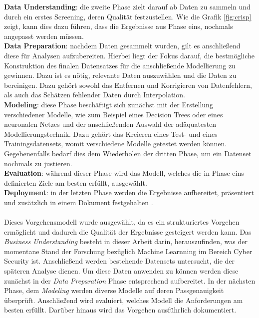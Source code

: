 \documentclass[
    12pt, %
    DIV10,
    ngerman, %
    a4paper, %
    oneside, %
    titlepage, %
    parskip=half, %
    headings=normal, %
    listof=totoc, %
    bibliography=totoc, %
    index=totoc, %
    captions=tableheading, %
    final %
]{scrreprt}
\begin{document}
\textbf{Data Understanding}: die zweite Phase zielt darauf ab Daten zu sammeln und durch ein erstes Screening, deren Qualität festzustellen. Wie die Grafik \ref{fig:crisp} zeigt, kann dies dazu führen, dass die Ergebnisse aus Phase eins, nochmals angepasst werden müssen.\\ 
\textbf{Data Preparation}: nachdem Daten gesammelt wurden, gilt es anschlie{\ss}end diese für Analysen aufzubereiten. Hierbei liegt der Fokus darauf, die bestmögliche Konstruktion des finalen Datensatzes für die anschlie{\ss}ende Modellierung zu gewinnen. Dazu ist es nötig, relevante Daten auszuwählen und die Daten zu bereinigen. Dazu gehört sowohl das Entfernen und Korrigieren von Datenfehlern, als auch das Schätzen fehlender Daten durch Interpolation.\\
\textbf{Modeling}: diese Phase beschäftigt sich zunächst mit der Erstellung verschiedener Modelle, wie zum Beispiel eines Decision Trees oder eines neuronalen Netzes und der anschlie{\ss}enden Auswahl der adäquatesten Modellierungstechnik. Dazu gehört das Kreieren eines Test- und eines Trainingsdatensets, womit verschiedene Modelle getestet werden können. Gegebenenfalls bedarf dies dem Wiederholen der dritten Phase, um ein Datenset nochmals zu justieren.\\
\textbf{Evaluation}: während dieser Phase wird das Modell, welches die in Phase eins definierten Ziele am besten erfüllt, ausgewählt.\\
\textbf{Deployment}: in der letzten Phase werden die Ergebnisse aufbereitet, präsentiert und zusätzlich in einem Dokument festgehalten \parencite{SmartVisionEurop}.\\\\
Dieses Vorgehensmodell wurde ausgewählt, da es ein strukturiertes Vorgehen ermöglicht und dadurch die Qualität der Ergebnisse gesteigert werden kann. Das \emph{Business Understanding} besteht in dieser Arbeit darin, herauszufinden, was der momentane Stand der Forschung bezüglich Machine Learnning im Bereich Cyber Security ist. Anschlie{\ss}end werden bestehende Datensets untersucht, die der späteren Analyse dienen.
Um diese Daten anwenden zu können werden diese zunächst in der \emph{Data Preparation} Phase entsprechend aufbereitet. In der nächsten Phase, dem \emph{Modeling} werden diverse Modelle auf deren Passgenauigkeit überprüft. Anschlie{\ss}end wird evaluiert,  welches Modell die Anforderungen am besten erfüllt. Darüber hinaus wird das Vorgehen ausführlich dokumentiert.
\end{document}
